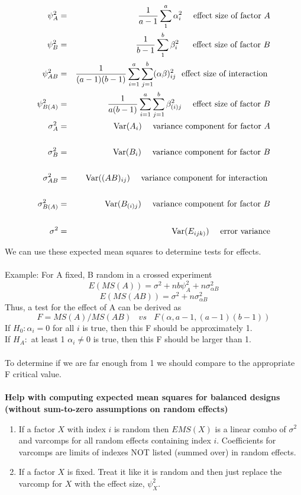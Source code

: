 \begin{eqnarray*}
\psi_A^2 & = & \frac{1}{a-1} \sum_1^a \alpha_i^2 \ \ \ \mbox{ effect size of factor } A\\
\psi_B^2 & = & \frac{1}{b-1} \sum_1^b \beta_i^2 \ \ \ \ \mbox{ effect size of factor } B\\
\psi_{AB}^2 & = & \frac{1}{(a-1)(b-1)} \sum_{i=1}^a\sum_{j=1}^b (\alpha\beta)_{ij}^2 \ \mbox{ effect size of interaction } \\
\psi_{B(A)}^2 & = & \frac{1}{a(b-1)} \sum_{i=1}^a\sum_{j=1}^b \beta_{(i)j}^2 \ \ \ \mbox{ effect size of factor } B\\
\sigma_A^2 & = & \mbox{Var}(A_i) \ \ \ \mbox{ variance component for factor } A\\
\\
\sigma_B^2 & = & \mbox{Var}(B_i) \ \ \ \mbox{ variance component for factor } B\\
\\
\sigma_{AB}^2 & = & \mbox{Var}((AB)_{ij}) \ \ \ \mbox{ variance component for interaction } \\
\\
\sigma_{B(A)}^2 & = & \mbox{Var}(B_{(i)j})\ \ \ \mbox{ variance component for factor }B \\
\\
\sigma^2 & = & \mbox{Var}(E_{ijk)})\ \ \ \mbox{ error variance} 
\end{eqnarray*} 

We can use these expected mean squares to determine tests for effects.\\~\\
Example: For A fixed, B random in a crossed experiment
$$E(MS(A))=\sigma^2 + nb \psi_A^2 + n\sigma_{\alpha B}^2$$
$$E(MS(AB))=\sigma^2 + n\sigma_{\alpha B}^2$$
Thus, a test for the effect of A can be derived as 
$$F=MS(A)/MS(AB)~~~~vs~~~~F(\alpha, a-1, (a-1)(b-1))$$
If $H_0: \alpha_i=0$ for all $i$ is true, then this F should be approximately 1. \\
If $H_A:$ at least 1 $\alpha_i\neq 0$ is true, then this F should be larger than 1.\\~\\
To determine if we are far enough from 1 we should compare to the appropriate F critical value.\\~\\

\textbf{Help with computing expected mean squares for balanced designs (without sum-to-zero assumptions on random effects)}
\begin{enumerate}
\item If a factor $X$ with index $i$ is random then $EMS(X)$ is a linear combo of $\sigma^2$ and varcomps for all random effects containing index $i$.  Coefficients for varcomps are limits of indexes NOT listed (summed over) in random effects.
\item If a factor $X$ is fixed.  Treat it like it is random and then just replace the varcomp for $X$ with the effect size, $\psi_X^2$. 
\end{enumerate} 

